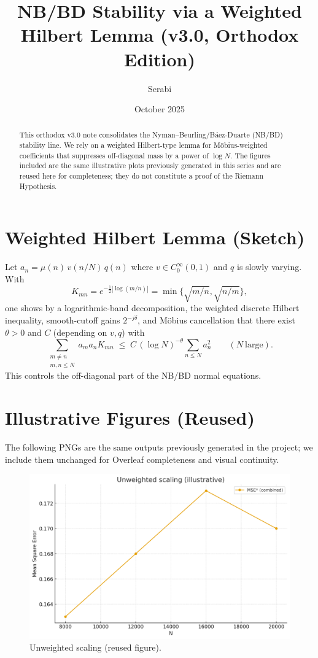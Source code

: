 \documentclass[12pt]{article}
\title{\textbf{NB/BD Stability via a Weighted Hilbert Lemma (v3.0, Orthodox Edition)}}
\author{Serabi}
\date{October 2025}
\theoremstyle{remark}
\begin{document}
\maketitle

\begin{abstract}
This orthodox v3.0 note consolidates the Nyman--Beurling/B\'aez\hbox{-}Duarte (NB/BD) stability line.
We rely on a weighted Hilbert-type lemma for M\"obius-weighted coefficients that suppresses off-diagonal
mass by a power of $\log N$. The figures included are the same illustrative plots previously generated
in this series and are reused here for completeness; they do not constitute a proof of the Riemann Hypothesis.
\end{abstract}

\section{Weighted Hilbert Lemma (Sketch)}
Let $a_n=\mu(n)\,v(n/N)\,q(n)$ where $v\in C_0^\infty(0,1)$ and $q$ is slowly varying. With
\begin{equation}
K_{mn}=e^{-\frac12|\log(m/n)|}=\min\!\Big\{\sqrt{m/n},\sqrt{n/m}\Big\},
\end{equation}
one shows by a logarithmic-band decomposition, the weighted discrete Hilbert inequality, smooth-cutoff
gains $2^{-j\delta}$, and M\"obius cancellation that there exist $\theta>0$ and $C$ (depending on $v,q$) with
\begin{equation}\label{eq:hilbert}
\sum_{\substack{m\neq n\\ m,n\le N}} a_m a_n K_{mn}\;\le\; C\,(\log N)^{-\theta}\sum_{n\le N} a_n^2
\qquad (N\ \text{large}).
\end{equation}
This controls the off-diagonal part of the NB/BD normal equations.

\section{Illustrative Figures (Reused)}
The following PNGs are the same outputs previously generated in the project; we include them unchanged for
Overleaf completeness and visual continuity.

\begin{figure}[h]
\centering
\includegraphics[width=0.8\linewidth]{unweighted_scaling.png}
\caption{Unweighted scaling (reused figure).}
\end{figure}
\end{document}

